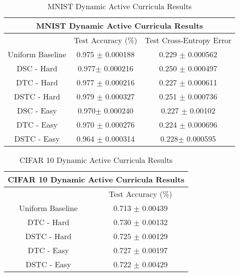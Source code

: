 \begin{table}[h!]
\caption{MNIST Dynamic Active Curricula  Results} \label{tab:MNIST DACResults}
\begin{tabular}{|c||c|c|}
\hline
\multicolumn{3}{|c|}{MNIST Dynamic Active Curricula Results} \\
\hline
 & Test Accuracy (\%) & Test Cross-Entropy Error \\
\hline
Uniform Baseline&  0.975 $\pm$ 0.000188& 0.229 $\pm$ 0.000562 \\
\hline
DSC - Hard& 0.977$ \pm$ 0.000216& 0.250 $\pm$ 0.000497 \\
\hline
DTC - Hard&  0.977  $\pm$ 0.000216 & 0.227 $\pm$ 0.000611 \\
\hline
DSTC - Hard & 0.979 $\pm$ 0.000327 & 0.251 $\pm$ 0.000736\\
\hline
DSC - Easy& 0.970$ \pm$ 0.000240 & 0.227 $\pm$ 0.00102 \\
\hline
DTC - Easy & 0.970 $\pm$ 0.000276 & 0.224 $\pm$ 0.000696 \\
\hline
DSTC - Easy & 0.964 $\pm$ 0.000314 & 0.228$\pm$ 0.000595 \\
\hline
\end{tabular}
\end{table}

\begin{table}[h!]
\caption{CIFAR 10 Dynamic Active Curricula  Results} \label{tab:CIFAR DACResults}
\begin{tabular}{|c||c|}
\hline
\multicolumn{2}{|c|}{CIFAR 10 Dynamic Active Curricula Results} \\
\hline
 & Test Accuracy (\%) \\
\hline
Uniform Baseline&  0.713 $\pm$ 0.00439\\
\hline
DTC - Hard&  0.730 $\pm$ 0.00132 \\
\hline
DSTC - Hard & 0.725 $\pm$ 0.00129\\
\hline
DTC - Easy & 0.727 $\pm$ 0.00197 \\
\hline
DSTC - Easy & 0.722 $\pm$ 0.00429 \\
\hline
\end{tabular}
\end{table}
